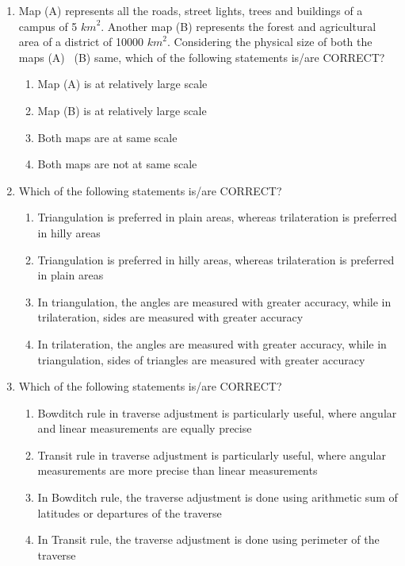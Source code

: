 \documentclass[12pt]{article}
\begin{document}
\begin{enumerate}
\item Map (A) represents all the roads, street lights, trees and buildings of a campus of
5 ${km}^2$. Another map (B) represents the forest and agricultural area of a district of
10000 ${km}^2$. Considering the physical size of both the maps (A) \  (B) same, which
of the following statements is/are CORRECT?

\begin{enumerate}
    \item Map (A) is at relatively large scale 
   \item Map (B) is at relatively large scale 
   \item Both maps are at same scale 
   \item Both maps are not at same scale 
\end{enumerate}

\item Which of the following statements is/are CORRECT? 
\begin{enumerate}
    \item Triangulation is preferred in plain areas, whereas trilateration is preferred in hilly
areas 
   \item Triangulation is preferred in hilly areas, whereas trilateration is preferred in plain
areas 
   \item In triangulation, the angles are measured with greater accuracy, while in
trilateration, sides are measured with greater accuracy 
   \item In trilateration, the angles are measured with greater accuracy, while in
triangulation, sides of triangles are measured with greater accuracy 
\end{enumerate}

\item Which of the following statements is/are CORRECT?

\begin{enumerate}
    \item Bowditch rule in traverse adjustment is particularly useful, where angular and linear
measurements are equally precise 
   \item Transit rule in traverse adjustment is particularly useful, where angular
measurements are more precise than linear measurements 
   \item In Bowditch rule, the traverse adjustment is done using arithmetic sum of latitudes
or departures of the traverse 
   \item In Transit rule, the traverse adjustment is done using perimeter of the traverse
\end{enumerate}


\end{enumerate}
\end{document}
